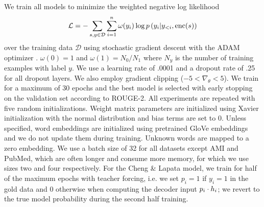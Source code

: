


We train all models to minimize the weighted negative log likelihood
\[\mathcal{L} = -\sum_{s,y\in \mathcal{D}} \sum_{i=1}^\docSize \omega(y_i) \log p\left(y_i|y_{<i},
\operatorname{enc}(\sent)\right)\]
over the training data $\mathcal{D}$
using stochastic gradient descent with the ADAM optimizer
\cite{kingma2014adam}.
$\omega(0)=1$ and $\omega(1) = N_0/N_1$ where $N_y$ is the number of 
training examples with label $y$.
    We use a learning rate of .0001 and a dropout rate of .25 for all dropout
    layers. We also employ gradient clipping ($-5 < \nabla_\theta < 5$).
    We train for a maximum of 30 epochs and the best
    model is selected with early stopping on the validation set according
    to ROUGE-2. All experiments are repeated with five random
    initializations. Weight matrix parameters are initialized using 
    Xavier initialization with the normal distribution 
    \cite{glorot2010understanding} and bias terms are set to 0.
    Unless specified, word embeddings are initialized 
    using pretrained GloVe embeddings \cite{pennington2014glove} and we do 
    not update them during training. Unknown words are mapped to a zero 
    embedding.
    We use a batch size of 32 for all datasets except AMI and PubMed, which
    are often longer and consume more memory, for
    which we use sizes two and four respectively.
    For the Cheng \& Lapata model, we train for half of the maximum epochs 
    with teacher forcing, i.e. we set $p_i = 1$
    if $y_i = 1$ in the gold data and 0 otherwise 
    when computing the decoder input 
    $p_i \cdot \sentEmb[i]$; we revert to the true model probability 
    during the second half training.







